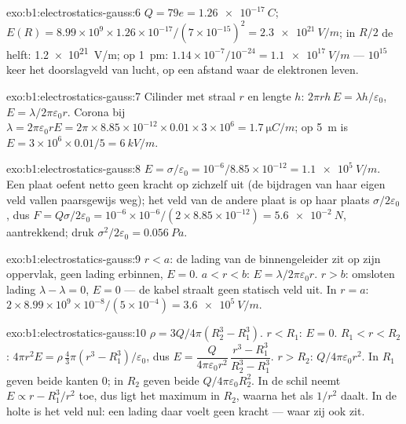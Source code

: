 \begin{solution}{exo:b1:electrostatics-gauss:6}
$Q = 79e = \qty{1.26e-17}{C}$; $E(R) = 8.99 \times 10^9 \times 1.26 \times 10^{-17}/
(7 \times 10^{-15})^2 = \qty{2.3e21}{V/m}$; in $R/2$ de helft: \qty{1.2e21}{V/m}; op
\qty{1}{pm}: $1.14 \times 10^{-7}/10^{-24} = \qty{1.1e17}{V/m}$ --- $10^{15}$ keer
het doorslagveld van lucht, op een afstand waar de elektronen leven.
\end{solution}

\begin{solution}{exo:b1:electrostatics-gauss:7}
Cilinder met straal $r$ en lengte $h$: $2\pi rh\,E = \lambda h/\varepsilon_0$, $E =
\lambda/2\pi\varepsilon_0r$. Corona bij $\lambda = 2\pi\varepsilon_0 rE = 2\pi \times 8.85 \times
10^{-12} \times 0.01 \times 3 \times 10^6 = \qty{1.7}{\micro C/m}$; op \qty{5}{m} is
$E = 3 \times 10^6 \times 0.01/5 = \qty{6}{kV/m}$.
\end{solution}

\begin{solution}{exo:b1:electrostatics-gauss:8}
$E = \sigma/\varepsilon_0 = 10^{-6}/8.85 \times 10^{-12} = \qty{1.1e5}{V/m}$. Een plaat
oefent netto geen kracht op zichzelf uit (de bijdragen van haar eigen veld vallen
paarsgewijs weg); het veld van de andere plaat is op haar plaats $\sigma/2\varepsilon_0$, dus
$F = Q\sigma/2\varepsilon_0 = 10^{-6} \times 10^{-6}/(2 \times 8.85 \times 10^{-12}) =
\qty{5.6e-2}{N}$, aantrekkend; druk $\sigma^2/2\varepsilon_0 = \qty{0.056}{Pa}$.
\end{solution}

\begin{solution}{exo:b1:electrostatics-gauss:9}
$r < a$: de lading van de binnengeleider zit op zijn oppervlak, geen lading
erbinnen, $E = 0$. $a < r < b$: $E = \lambda/2\pi\varepsilon_0r$. $r > b$: omsloten
lading $\lambda - \lambda = 0$, $E = 0$ --- de kabel straalt geen statisch
veld uit. In $r = a$: $2 \times 8.99 \times 10^9 \times 10^{-8}/(5 \times 10^{-4}) =
\qty{3.6e5}{V/m}$.
\end{solution}

\begin{solution}{exo:b1:electrostatics-gauss:10}
$\rho = 3Q/4\pi(R_2^3 - R_1^3)$. $r < R_1$: $E = 0$. $R_1 < r < R_2$: $4\pi r^2E =
\rho\,\tfrac43\pi(r^3 - R_1^3)/\varepsilon_0$, dus $E = \dfrac{Q}{4\pi\varepsilon_0r^2}\,
\dfrac{r^3 - R_1^3}{R_2^3 - R_1^3}$. $r > R_2$: $Q/4\pi\varepsilon_0r^2$. In $R_1$ geven beide
kanten $0$; in $R_2$ geven beide $Q/4\pi\varepsilon_0R_2^2$. In de schil neemt $E
\propto r - R_1^3/r^2$ toe, dus ligt het maximum in $R_2$, waarna
het als $1/r^2$ daalt. In de holte is het veld nul: een lading
daar voelt geen kracht --- waar zij ook zit.
\end{solution}

